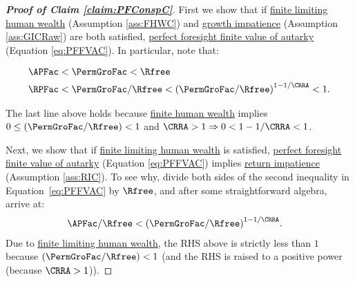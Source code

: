 \documentclass[\econtexRoot/BufferStockTheory]{subfiles}
\begin{document}
\begin{proof}[\textbf{Proof of Claim \ref{claim:PFConspC}}]
First we show that if \hyperlink{FHWC}{finite limiting human wealth} (Assumption \ref{ass:FHWC}) and \hyperlink{GIC}{growth impatience} (Assumption \ref{ass:GICRaw}) are both satisfied, \hyperlink{PFFVAC}{perfect foresight finite value of autarky} (Equation \eqref{eq:PFFVAC}). In particular, note that:
  
\begin{equation}\label{eq:GICandFHWCimplyPFFVAC}
  \begin{split}
    \APFac & < \PermGroFac < \Rfree
    \\   \RPFac & < \PermGroFac/\Rfree < {(\PermGroFac/\Rfree)}^{1-1/\CRRA} < 1.
  \end{split}
\end{equation}

The last line above holds because \hyperlink{FHWC}{finite human wealth} implies $0 \leq (\PermGroFac/\Rfree) < 1$ and $\CRRA > 1 \Rightarrow 0 < 1-1/\CRRA < 1$. 

Next, we show that if \hyperlink{FHWC}{finite limiting human wealth} is satisfied, \hyperlink{PFFVAC}{perfect foresight finite value of autarky} (Equation \eqref{eq:PFFVAC}) implies \hyperlink{RIC}{return impatience} (Assumption \ref{ass:RIC}). To see why, divide both sides of the second inequality in Equation~\eqref{eq:PFFVAC} by $\Rfree$, and after some straightforward algebra, arrive at:
%
  \begin{align}
    \APFac/\Rfree & < {(\PermGroFac/\Rfree)}^{1-1/\CRRA}  \label{eq:FHWCandPFFVACimplyRIC}.
  \end{align}
  Due to \hyperlink{FHWC}{finite limiting human wealth}, the RHS above is strictly less than $ 1$ because $(\PermGroFac/\Rfree) < 1$ (and the RHS is raised to a positive power (because $\CRRA>1$)).  
\end{proof}
%
\begin{comment}
The first panel of Table~\ref{table:Required} summarizes: The PF-Unconstrained model has a non-degenerate limiting solution if we impose the {\RIC} and {\FHWC} (these conditions are necessary as well as sufficient).
Together the {\PFFVAC} and the {\FHWC} imply the {\RIC}.
If we impose the {\GICRaw} and the {\FHWC}, both the {\PFFVAC} and the {\RIC} follow, so {\GICRaw}+{\FHWC} are also sufficient.
But there are circumstances under which the {\RIC} and {\FHWC} can hold while the {\PFFVAC} fails (`\cncl{\PFFVAC}').
For example, if $\PermGroFac=0$, the problem is a standard `cake-eating' problem with a non-degenerate solution under the {\RIC} (when the consumer has access to capital markets).%
\end{comment}
\end{document}
